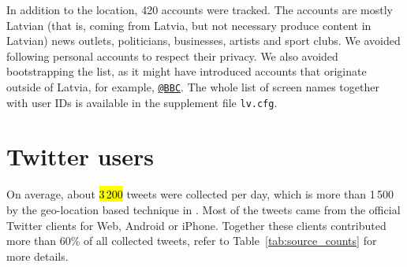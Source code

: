 \documentclass{IOS-Book-Article}
\makeatletter
\newcommand{\sn}[1]{\href{https://twitter.com/#1}{\texttt{@#1}}}
\newcommand{\sfile}[1]{\texttt{#1}}
\makeatother
\begin{document}
In addition to the location, 420 accounts were tracked.\footnotemark{} The accounts are mostly Latvian (that is, coming from Latvia, but not necessary produce content in Latvian) news outlets, politicians, businesses, artists and sport clubs. We avoided following personal accounts to respect their privacy. We also avoided bootstrapping the list, as it might have introduced accounts that originate outside of Latvia, for example, \sn{BBC}. The whole list of screen names together with user IDs is available in the supplement file \sfile{lv.cfg}.





\section{Twitter users}
\label{sec:global-analysis}



On average, about \hl{3\,200} tweets were collected per day, which is more than 1\,500 by the geo-location based technique in \cite{milajevs:2017:BUCC}. Most of the tweets came from the official Twitter clients for Web, Android or iPhone. Together these clients contributed more than 60\% of all collected tweets, refer to Table~\ref{tab:source_counts} for more details.
\end{document}
